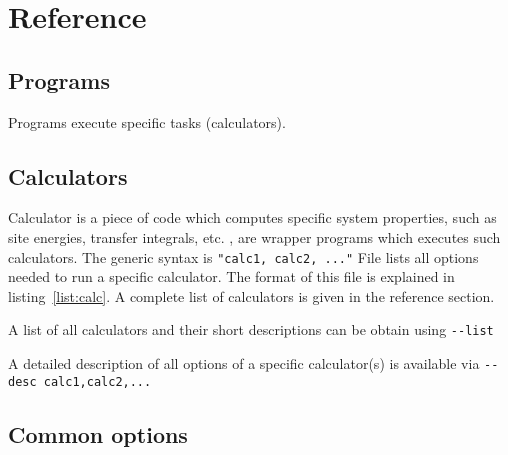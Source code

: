 \chapter{Reference}
\label{sec:reference}
\section{Programs}
\label{ref:programs}
\label{sec:programs}
Programs execute specific tasks (calculators). 



\section{Calculators}
\label{ref:calculators}
\label{sec:calculators}

Calculator is a piece of code which computes specific system properties, such as site energies, transfer integrals, etc. \ctprun, \kmcrun are wrapper programs which executes such calculators. The generic syntax is 
\vskip 0.2cm
{\noindent \small \ctprun \exe \texttt{"calc1, calc2, ..."} \opt \xmloptions }
\vskip 0.2cm
%
File \xmloptions lists all options needed to run a specific calculator. The format of this file is explained in listing~\ref{list:calc}. A complete list of calculators is given in the  reference section.
%


A list of all calculators and their short descriptions can be obtain using 
\vskip 0.1cm
{\noindent \small \ctprun \texttt{-{}-list} }
\vskip 0.1cm

A detailed description of all options of a specific calculator(s) is available via
\vskip 0.1cm
{\noindent \small \ctprun \texttt{-{}-desc calc1,calc2,...} }


\vfill

\section{Common options}
\label{ref:options}
{\small 

}
\vfill
